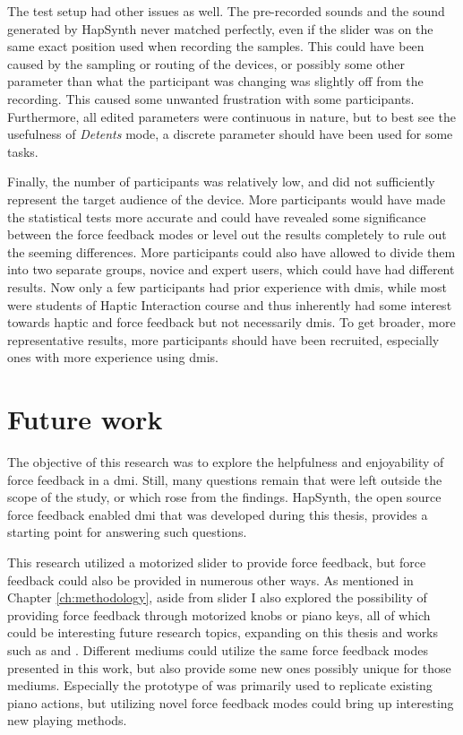 The test setup had other issues as well. The pre-recorded sounds and the sound generated by HapSynth never matched perfectly, even if the slider was on the same exact position used when recording the samples. This could have been caused by the sampling or routing of the devices, or possibly some other parameter than what the participant was changing was slightly off from the recording. This caused some unwanted frustration with some participants. Furthermore, all edited parameters were continuous in nature, but to best see the usefulness of \textit{Detents} mode, a discrete parameter should have been used for some tasks.

Finally, the number of participants was relatively low, and did not sufficiently represent the target audience of the device. More participants would have made the statistical tests more accurate and could have revealed some significance between the force feedback modes or level out the results completely to rule out the seeming differences. More participants could also have allowed to divide them into two separate groups, novice and expert users, which could have had different results. Now only a few participants had prior experience with \glspl{dmi}, while most were students of Haptic Interaction course and thus inherently had some interest towards haptic and force feedback but not necessarily \glspl{dmi}. To get broader, more representative results, more participants should have been recruited, especially ones with more experience using \glspl{dmi}.

\section{Future work}

The objective of this research was to explore the helpfulness and enjoyability of force feedback in a \gls{dmi}. Still, many questions remain that were left outside the scope of the study, or which rose from the findings. HapSynth, the open source force feedback enabled \gls{dmi} that was developed during this thesis, provides a starting point for answering such questions.

This research utilized a motorized slider to provide force feedback, but force feedback could also be provided in numerous other ways. As mentioned in Chapter \ref{ch:methodology}, aside from slider I also explored the possibility of providing force feedback through motorized knobs or piano keys, all of which could be interesting future research topics, expanding on this thesis and works such as \textcite{kirkegaard2020} and \textcite{timmermans2020}. Different mediums could utilize the same force feedback modes presented in this work, but also provide some new ones possibly unique for those mediums. Especially the prototype of \textcite{timmermans2020} was primarily used to replicate existing piano actions, but utilizing novel force feedback modes could bring up interesting new playing methods.

